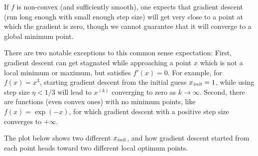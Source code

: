 If $f$ is non-convex (and sufficiently smooth),
one expects that
gradient descent (run long enough with small enough step size) will get very close to a point at which the gradient is zero, though
we cannot guarantee that it will converge to a global minimum point.

There are two notable exceptions to this common sense expectation: First, gradient descent can get stagnated while approaching a point $x$ which is not a local minimum or maximum,
but satisfies $f'(x)=0$. For example, for $f(x)=x^3$, starting gradient descent from the
initial guess $x_{\it init}=1$, while using step size $\eta<1/3$
will lead to $x^{(k)}$ converging to zero as $k\to\infty$. Second, there are functions (even convex ones) with no minimum points,
like $f(x)=\exp(-x)$, for which gradient descent with a positive step size converges to $+\infty$.

The plot below shows two different $x_{\it init}$, and how gradient descent
started from each point heads toward two different local optimum points.
\begin{center}
\end{center}

